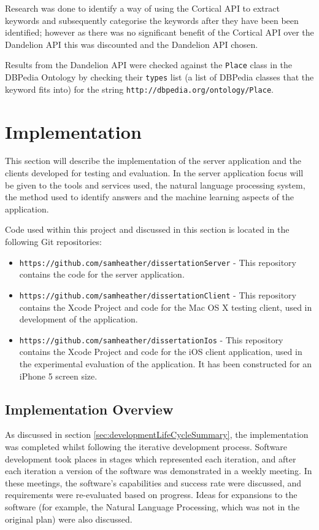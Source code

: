 \documentclass[authoryearcitations]{UoYCSproject}
\begin{document}
Research was done to identify a way of using the Cortical API to extract keywords and subsequently categorise the keywords after they have been been identified; however as there was no significant benefit of the Cortical API over the Dandelion API this was discounted and the Dandelion API chosen.

Results from the Dandelion API were checked against the \texttt{Place} class in the DBPedia Ontology by checking their \texttt{types} list (a list of DBPedia classes that the keyword fits into) for the string \texttt{http://dbpedia.org/ontology/Place}.

\newpage
\chapter{Implementation}
\label{sec:implementation}
This section will describe the implementation of the server application and the clients developed for testing and evaluation. In the server application focus will be given to the tools and services used, the natural language processing system, the method used to identify answers and the machine learning aspects of the application.

Code used within this project and discussed in this section is located in the following Git repositories:
\begin{itemize}
  \item \texttt{https://github.com/samheather/dissertationServer} - This repository contains the code for the server application.
  \item \texttt{https://github.com/samheather/dissertationClient} - This repository contains the Xcode Project and code for the Mac OS X testing client, used in development of the application.
  \item \texttt{https://github.com/samheather/dissertationIos} - This repository contains the Xcode Project and code for the iOS client application, used in the experimental evaluation of the application. It has been constructed for an iPhone 5 screen size.
\end{itemize}

\section{Implementation Overview}
As discussed in section \ref{sec:developmentLifeCycleSummary}, the implementation was completed whilst following the iterative development process. Software development took places in stages which represented each iteration, and after each iteration a version of the software was demonstrated in a weekly meeting. In these meetings, the software's capabilities and success rate were discussed, and requirements were re-evaluated based on progress. Ideas for expansions to the software (for example, the Natural Language Processing, which was not in the original plan) were also discussed.
\end{document}
